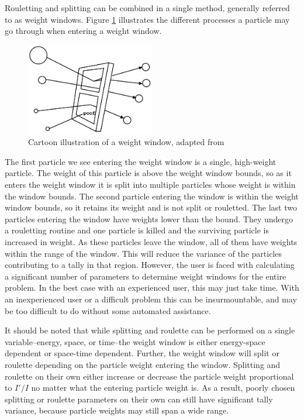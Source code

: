 Rouletting and splitting can be combined in a
single method, generally referred to as weight windows. Figure \ref{fig:ww-mcnp}
illustrates the different processes a particle may go through when entering a
weight window.
%
\begin{figure}
  \centering
  \includegraphics[width=0.5\textwidth]{./chapters/lit_review/figures/ww-mcnp.png}
  \caption[Weight window illustration]{Cartoon illustration of a weight window,
    adapted from \cite{brown_mcnp_2002, mcnp_manual_v2}}
  \label{fig:ww-mcnp}
\end{figure}
%
The first particle we see entering the weight window is a single, high-weight
particle. The weight of this particle is above the weight window bounds, so as
it enters the weight window it is split into multiple particles whose weight is
within the window bounds. The second particle entering the window is within the
weight window bounds, so it retains its weight and is not split or rouletted.
The last two particles entering the window have weights lower than the bound.
They undergo a rouletting routine and one particle is killed and the surviving
particle is increased in weight. As these particles leave the window, all of
them have weights within the range of the window. This will reduce the variance
of the particles contributing to a tally in that region. However, the user is
faced with calculating a significant number of parameters to
determine weight windows for the entire problem. In the best case with an
experienced user, this may just take time. With an inexperienced user or a
difficult problem this can
be insurmountable, and may be too difficult to do without some automated
assistance.

It should be noted that
while splitting and roulette can be performed on a single variable--energy,
space, or time--the weight window is either energy-space
dependent or space-time dependent. Further, the weight window will split or
roulette depending on the particle weight entering the window. Splitting and
roulette on their own either increase or decrease the particle weight
proportional to $I'/I$ no matter what the entering particle weight is. As a
result, poorly chosen splitting or roulette parameters on their own can still
have significant tally variance, because particle weights may still span a wide
range.

